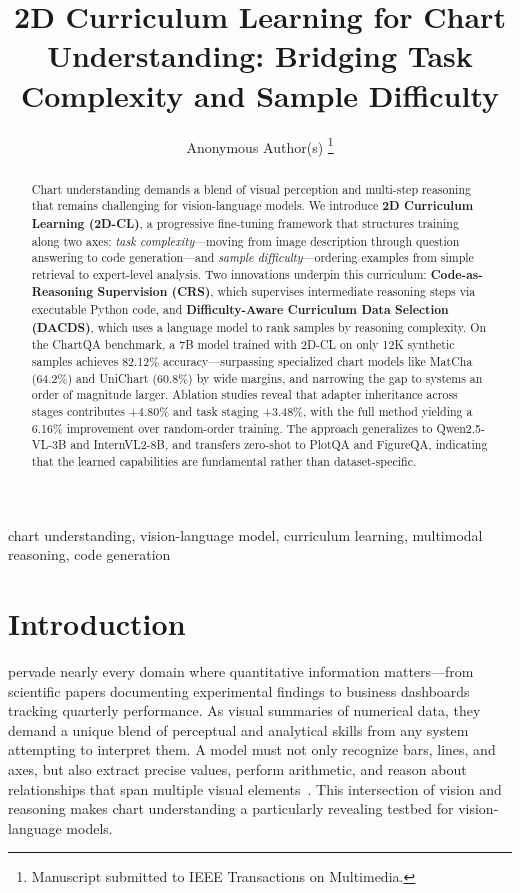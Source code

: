 ﻿\documentclass[journal]{IEEEtran}
\newcommand{\method}{2D-CL}
\newcommand{\fullmethod}{2D Curriculum Learning}
\newcommand{\crs}{CRS}
\newcommand{\dacds}{DACDS}
\begin{document}
\title{2D Curriculum Learning for Chart Understanding: Bridging Task Complexity and Sample Difficulty}

\author{Anonymous Author(s)%
\thanks{Manuscript submitted to IEEE Transactions on Multimedia.}}

\maketitle

\begin{abstract}
Chart understanding demands a blend of visual perception and multi-step reasoning that remains challenging for vision-language models.
We introduce \textbf{\fullmethod{} (\method{})}, a progressive fine-tuning framework that structures training along two axes: \textit{task complexity}---moving from image description through question answering to code generation---and \textit{sample difficulty}---ordering examples from simple retrieval to expert-level analysis.
Two innovations underpin this curriculum: \textbf{Code-as-Reasoning Supervision (\crs{})}, which supervises intermediate reasoning steps via executable Python code, and \textbf{Difficulty-Aware Curriculum Data Selection (\dacds{})}, which uses a language model to rank samples by reasoning complexity.
On the ChartQA benchmark, a 7B model trained with \method{} on only 12K synthetic samples achieves 82.12\% accuracy---surpassing specialized chart models like MatCha (64.2\%) and UniChart (60.8\%) by wide margins, and narrowing the gap to systems an order of magnitude larger.
Ablation studies reveal that adapter inheritance across stages contributes +4.80\% and task staging +3.48\%, with the full method yielding a 6.16\% improvement over random-order training.
The approach generalizes to Qwen2.5-VL-3B and InternVL2-8B, and transfers zero-shot to PlotQA and FigureQA, indicating that the learned capabilities are fundamental rather than dataset-specific.
\end{abstract}

\begin{IEEEkeywords}
chart understanding, vision-language model, curriculum learning, multimodal reasoning, code generation
\end{IEEEkeywords}

\section{Introduction}
 pervade nearly every domain where quantitative information matters---from scientific papers documenting experimental findings to business dashboards tracking quarterly performance. As visual summaries of numerical data, they demand a unique blend of perceptual and analytical skills from any system attempting to interpret them. A model must not only recognize bars, lines, and axes, but also extract precise values, perform arithmetic, and reason about relationships that span multiple visual elements~\cite{masry2022chartqa,methani2020plotqa}. This intersection of vision and reasoning makes chart understanding a particularly revealing testbed for vision-language models.
\end{document}
